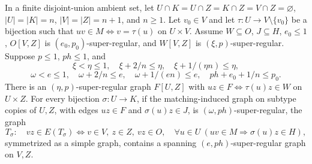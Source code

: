 \begin{lemma}
In a finite disjoint-union ambient set, let
$U\cap K=U\cap Z=K\cap Z=V\cap Z=\varnothing$,
$|U|=|K|=n$, $|V|=|Z|=n+1$, and $n\ge1$.
Let $v_0\in V$ and let $\tau:U\to V\setminus\{v_0\}$ be a bijection
such that $uv\in M\Longleftrightarrow v=\tau(u)$ on $U\times V$.
Assume $W\subseteq O$, $J\subseteq H$, $e_0\le1$,
$O[V,Z]$ is $(e_0,p_0)$-super-regular, and $W[V,Z]$ is
$(\xi,p)$-super-regular. Suppose $p\le1$, $ph\le1$, and
\[
\xi<\eta\le1,\quad\xi+2/n\le\eta,\quad
\xi+1/(\eta n)\le\eta,
\]
\[
\omega<e\le1,\quad\omega+2/n\le e,\quad
\omega+1/(en)\le e,\quad ph+e_0+1/n\le p_0.
\]
There is an $(\eta,p)$-super-regular graph $F[U,Z]$ with
$uz\in F\Longleftrightarrow\tau(u)z\in W$ on $U\times Z$.
For every bijection $\sigma:U\to K$, if the matching-induced graph on
subtype copies of $U,Z$, with edges $uz\in F$ and $\sigma(u)z\in J$,
is $(\omega,ph)$-super-regular, the graph
\[
T_\sigma:\quad vz\in E(T_\sigma)\Longleftrightarrow
v\in V,\ z\in Z,\ vz\in O,\quad
\forall u\in U\ (uv\in M\Rightarrow\sigma(u)z\in H),
\]
symmetrized as a simple graph, contains a spanning
$(e,ph)$-super-regular graph on $V,Z$.
\end{lemma}

